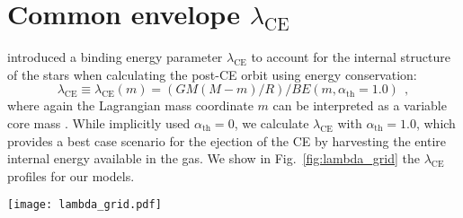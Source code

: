 \documentclass[twocolumn,twocolappendix,trackchanges]{aastex63}
\DeclareRobustCommand{\Figref}[1]{Fig.~\ref{#1}}
\begin{document}
\section{Common envelope $\lambda_\mathrm{CE}$}
\label{sec:pop_synth_app}

\cite{dekool:1990} introduced a binding energy parameter
$\lambda_\mathrm{CE}$ to account for the internal structure of the
stars when calculating the post-CE orbit using energy conservation:
\begin{equation}
  \label{eq:lambda}
  \lambda_\mathrm{CE} \equiv \lambda_\mathrm{CE}(m) = (GM(M-m)/R)/BE(m, \alpha_\mathrm{th}=1.0) \ \ ,
\end{equation}
where again the Lagrangian mass coordinate $m$ can be interpreted as a
variable core mass \citep[see also][]{demarco:11, ivanova:2013}. While
\cite{dekool:1990} implicitly used
  $\alpha_\mathrm{th}=0$, we calculate $\lambda_\mathrm{CE}$ with
  $\alpha_\mathrm{th}=1.0$, which provides a best case scenario for
  the ejection of the CE by harvesting the entire internal energy
  available in the gas. We show
in \Figref{fig:lambda_grid} the $\lambda_\mathrm{CE}$ profiles for our models.

\begin{figure*}[htbp]
  \centering
  \texttt{[image: lambda\_grid.pdf]}
  \caption{Profile of the binding energy parameter
    $\lambda_\mathrm{CE}$ as a function of mass coordinate for
    accretors (orange), single stars (red), and our engineered stars
    (other colors) at selected total radii. The vertical lines
    mark the outer edge of the helium cores of the accretor and single
    star, that is the outermost location where $Y>0.1$ and $X<0.01$
    (solid lines), or $X<0.1$ (dashed), or $X<0.2$ (dot-dashed).}
  \label{fig:lambda_grid}
\end{figure*}
\end{document}

